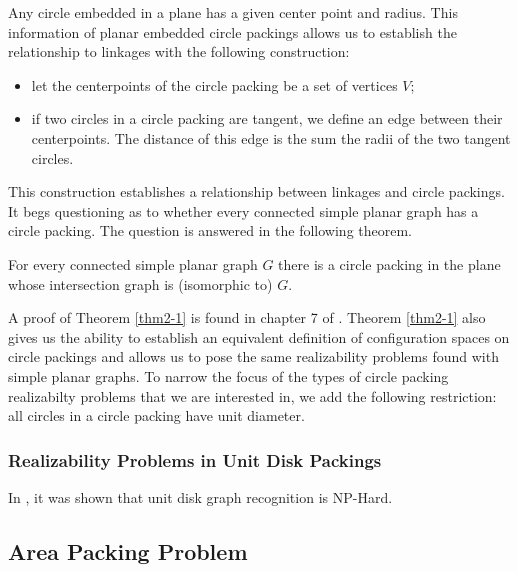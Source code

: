 Any circle embedded in a plane has a given center point and radius.  This information of planar embedded circle packings allows us to establish the relationship to linkages with the following construction:
\begin{itemize}
\item[\rn{1}] let the centerpoints of the circle packing be a set of vertices $V$;
\item[\rn{2}] if two circles in a circle packing are tangent, we define an edge between their centerpoints.  The distance of this edge is the sum the radii of the two tangent circles.
\end{itemize}  
This construction establishes a relationship between linkages and circle packings.  It begs questioning as to whether every connected simple planar graph has a circle packing.  The question is answered in the following theorem.
\begin{thm}\label{thm2-1}
For every connected simple planar graph $G$ there is a circle packing in the
plane whose intersection graph is (isomorphic to) $G$.
\end{thm}



A proof of Theorem \ref{thm2-1} is found in chapter 7 of \cite{stephenson2005introduction}.  Theorem \ref{thm2-1} also gives us the ability to establish an equivalent definition of configuration spaces on circle packings and allows us to pose the same realizability problems found with simple planar graphs.  To narrow the focus of the types of circle packing realizabilty problems that we are interested in, we add the following restriction: all circles in a circle packing have unit diameter. 
\subsubsection{Realizability Problems in Unit Disk Packings}
In \cite{Breu19983}, it was shown that unit disk graph recognition is NP-Hard. 
\subsection{Area Packing Problem}


